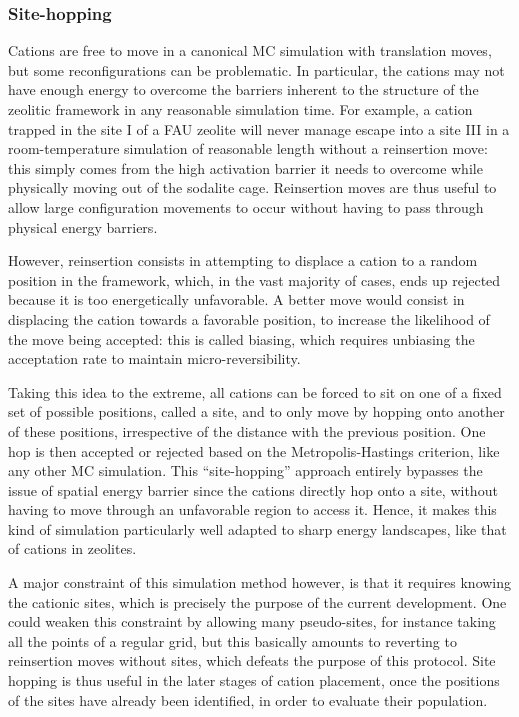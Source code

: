 \documentclass[main.tex]{subfiles}
\begin{document}
\subsubsection{Site-hopping}

\label{sitehopping}

Cations are free to move in a canonical MC simulation with translation moves, but some reconfigurations can be problematic. In particular, the cations may not have enough energy to overcome the barriers inherent to the structure of the zeolitic framework in any reasonable simulation time. For example, a cation trapped in the site I of a FAU zeolite will never manage escape into a site III in a room-temperature simulation of reasonable length without a reinsertion move: this simply comes from the high activation barrier it needs to overcome while physically moving out of the sodalite cage. Reinsertion moves are thus useful to allow large configuration movements to occur without having to pass through physical energy barriers.

However, reinsertion consists in attempting to displace a cation to a random position in the framework, which, in the vast majority of cases, ends up rejected because it is too energetically unfavorable. A better move would consist in displacing the cation towards a favorable position, to increase the likelihood of the move being accepted: this is called biasing, which requires unbiasing the acceptation rate to maintain micro-reversibility.

Taking this idea to the extreme, all cations can be forced to sit on one of a fixed set of possible positions, called a site, and to only move by hopping onto another of these positions, irrespective of the distance with the previous position. One hop is then accepted or rejected based on the Metropolis-Hastings criterion, like any other MC simulation. This ``site-hopping'' approach entirely bypasses the issue of spatial energy barrier since the cations directly hop onto a site, without having to move through an unfavorable region to access it. Hence, it makes this kind of simulation particularly well adapted to sharp energy landscapes, like that of cations in zeolites.

A major constraint of this simulation method however, is that it requires knowing the cationic sites, which is precisely the purpose of the current development. One could weaken this constraint by allowing many pseudo-sites, for instance taking all the points of a regular grid, but this basically amounts to reverting to reinsertion moves without sites, which defeats the purpose of this protocol. Site hopping is thus useful in the later stages of cation placement, once the positions of the sites have already been identified, in order to evaluate their population.
\end{document}
